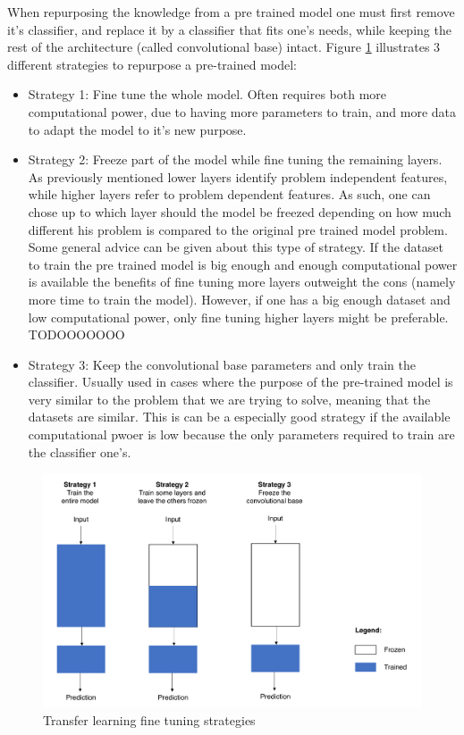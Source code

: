     When repurposing the knowledge from a pre trained model one must first remove it's classifier, and replace it by a classifier that fits one's needs, while keeping the rest of the architecture (called convolutional base) intact. Figure \ref{fig:transferlearning} illustrates 3 different strategies to repurpose a pre-trained model:
    \begin{itemize}
        \item Strategy 1: Fine tune the whole model. Often requires both more computational power, due to having more parameters to train, and more data to adapt the model to it's new purpose. 
        \item Strategy 2: Freeze part of the model while fine tuning the remaining layers. As previously mentioned lower layers identify problem independent features, while higher layers refer to problem dependent features. As such, one can chose up to which layer should the model be freezed depending on how much different his problem is compared to the original pre trained model problem. Some general advice can be given about this type of strategy. If the dataset to train the pre trained model is big enough and enough computational power is available the benefits of fine tuning more layers outweight the cons (namely more time to train the model). However, if one has a big enough dataset and low computational power, only fine tuning higher layers might be preferable. TODOOOOOOO  
        \item Strategy 3: Keep the convolutional base parameters and only train the classifier. Usually used in cases where the purpose of the pre-trained model is very similar to the problem that we are trying to solve, meaning that the datasets are similar. This is can be a especially good strategy if the available computational pwoer is low because the only parameters required to train are the classifier one's.
    \end{itemize}
    
    \begin{figure}[ht]
      \centering
        \includegraphics[scale=0.5, width=\linewidth]{figs/transfer_learning.png}
      \caption{Transfer learning fine tuning strategies \cite{marctransferlearning}}
      \label{fig:transferlearning}
    \end{figure}

